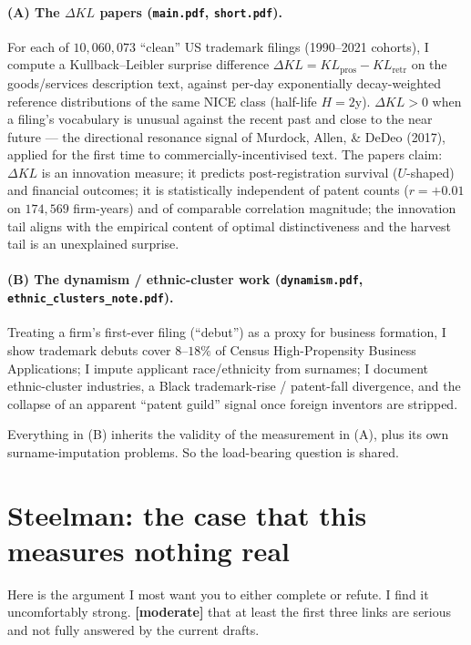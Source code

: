 \documentclass[11pt]{article}
\newcommand{\dkl}{\Delta KL}
\begin{document}
\paragraph{(A) The $\dkl$ papers (\texttt{main.pdf}, \texttt{short.pdf}).}
For each of $10{,}060{,}073$ ``clean'' US trademark filings
(1990--2021 cohorts), I compute a Kullback--Leibler surprise
difference $\dkl = KL_{\text{pros}} - KL_{\text{retr}}$ on the
goods/services description text, against per-day exponentially
decay-weighted reference distributions of the same NICE class
(half-life $H = 2$y). $\dkl > 0$ when a filing's vocabulary is
unusual against the recent past and close to the near future --- the
directional resonance signal of Murdock, Allen, \& DeDeo (2017),
applied for the first time to commercially-incentivised text. The
papers claim: $\dkl$ is an innovation measure; it predicts
post-registration survival ($U$-shaped) and financial outcomes; it
is statistically independent of patent counts ($r = +0.01$ on
$174{,}569$ firm-years) and of comparable correlation magnitude;
the innovation tail aligns with the empirical content of optimal
distinctiveness and the harvest tail is an unexplained surprise.

\paragraph{(B) The dynamism / ethnic-cluster work
(\texttt{dynamism.pdf}, \texttt{ethnic\_clusters\_note.pdf}).}
Treating a firm's first-ever filing (``debut'') as a proxy for
business formation, I show trademark debuts cover $8$--$18\%$ of
Census High-Propensity Business Applications; I impute applicant
race/ethnicity from surnames; I document ethnic-cluster industries,
a Black trademark-rise / patent-fall divergence, and the collapse of
an apparent ``patent guild'' signal once foreign inventors are
stripped.

Everything in (B) inherits the validity of the measurement in (A),
plus its own surname-imputation problems. So the load-bearing
question is shared.

\section{Steelman: the case that this measures nothing real}

Here is the argument I most want you to either complete or refute. I
find it uncomfortably strong. \textbf{[moderate]} that at least the
first three links are serious and not fully answered by the current
drafts.
\end{document}
